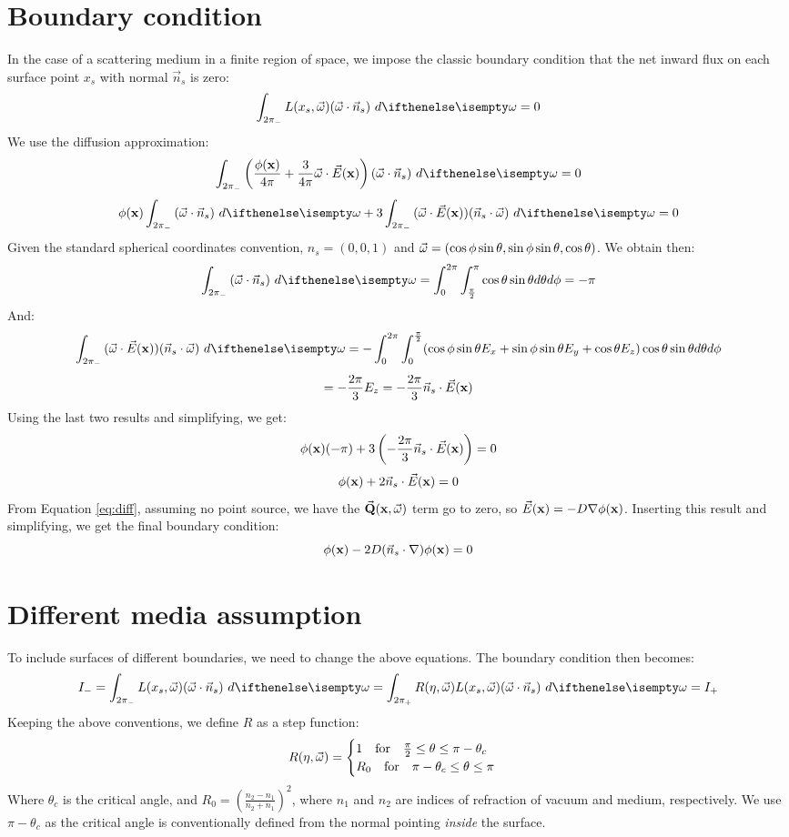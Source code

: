 \documentclass[10pt,a4paper]{article}
\begin{document}
\section{Boundary condition}
In the case of a scattering medium in a finite region of space, we impose the classic boundary condition that the net inward flux on each surface point $x_s$ with normal $\vec{n}_s$ is zero:
$$
\inwardhemisphere{L(x_s, \omegavec) (\omegavec \cdot \vec{n}_s)}{} = 0
$$
We use the diffusion approximation:
$$
\inwardhemisphere{\left(\frac{\xfunc{\phi}}{4\pi} + \frac{3}{4\pi} \omegavec \cdot \xvecfunc{E}\right) (\omegavec \cdot \vec{n}_s)}{} = 0
$$
$$
\xfunc{\phi} \inwardhemisphere{ (\omegavec \cdot \vec{n}_s)}{} + 3  \inwardhemisphere{(\omegavec \cdot \xvecfunc{E}) (\vec{n}_s \cdot \omegavec) }{} = 0
$$
Given the standard spherical coordinates convention, $n_s = (0,0,1)$ and $\vec{\omega} = (\cos\phi\sin\theta,\sin\phi\sin\theta,\cos\theta)$. We obtain then:
$$
\inwardhemisphere{ (\omegavec \cdot \vec{n}_s)}{} = \int_{0}^{2\pi} \int_{\frac{\pi}{2}}^{\pi} \cos\theta \sin\theta d\theta d\phi = -\pi
$$
And:
$$
\inwardhemisphere{(\omegavec \cdot \xvecfunc{E}) (\vec{n}_s \cdot \omegavec) }{} = -\int_{0}^{2\pi} \int_{0}^{\frac{\pi}{2}}(\cos\phi\sin\theta E_x+\sin\phi\sin\theta E_y+\cos\theta E_z) \cos\theta \sin\theta d\theta d\phi 
$$
$$
= -\frac{2\pi}{3} E_z = -\frac{2\pi}{3} \vec{n}_s \cdot \vec{E}(\mathbf{x})
$$
Using the last two results and simplifying, we get:
$$
{\phi}(\mathbf{x}) (-\pi) + 3 \left(-\frac{2\pi}{3} \vec{n}_s \cdot \vec{E}(\mathbf{x})\right)= 0
$$
$$
{\phi}(\mathbf{x}) + 2 \vec{n}_s \cdot \vec{E}(\mathbf{x}) = 0
$$
From Equation \ref{eq:diff}, assuming no point source, we have the $\vec{\mathbf{Q}}(\mathbf{x}, \vec{\omega})$ term go to zero, so $\vec{E}(\mathbf{x}) = - D{\nabla} {\phi}(\mathbf{x})$. Inserting this result and simplifying, we get the final boundary condition:
$$
{\phi}(\mathbf{x}) - 2 D (\vec{n}_s \cdot {\nabla}) {\phi}(\mathbf{x}) = 0
$$
\section{Different media assumption}
To include surfaces of different boundaries, we need to change the above equations. The boundary condition then becomes:
$$
I_- = \inwardhemisphere{L(x_s, \omegavec) (\omegavec \cdot \vec{n}_s)}{} = \hemisphere{R(\eta, \omegavec) L(x_s, \omegavec) (\omegavec \cdot \vec{n}_s)}{} = I_+
\label{eq:diffb}
$$
Keeping the above conventions, we define $R$ as a step function:
$$
R(\eta, \vec{\omega}) = 
\begin{cases}
1 \ \ \ \text{for}\ \ \ \frac{\pi}{2} \leq \theta \leq \pi - \theta_c\\
R_0\ \ \ \text{for}\ \ \  \pi - \theta_c \leq \theta \leq \pi\\
\end{cases}
$$
Where $\theta_c$ is the critical angle, and $R_0 = \left(\frac{n_2 - n_1}{n_2 + n_1} \right)^2$, where $n_1$ and $n_2$ are indices of refraction of vacuum and medium, respectively. We use $\pi - \theta_c$ as the critical angle is conventionally defined from the normal pointing \textit{inside} the surface.
\end{document}
